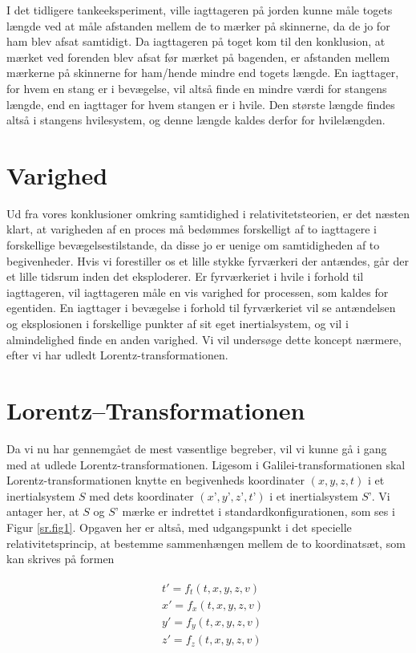 I det tidligere tankeeksperiment, ville iagttageren på jorden kunne måle togets længde ved at måle afstanden mellem de to mærker på skinnerne, da de jo for ham blev afsat samtidigt. Da iagttageren på toget kom til den konklusion, at mærket ved forenden blev afsat før mærket på bagenden, er afstanden mellem mærkerne på skinnerne for ham/hende mindre end togets længde. En iagttager, for hvem en stang er i bevægelse, vil altså finde en mindre værdi for stangens længde, end en iagttager for hvem stangen er i hvile. Den største længde findes altså i stangens hvilesystem, og denne længde kaldes derfor for hvilelængden.

\section{Varighed}

Ud fra vores konklusioner omkring samtidighed i relativitetsteorien, er det næsten klart, at varigheden af en proces må bedømmes forskelligt af to iagttagere i forskellige bevægelsestilstande, da disse jo er uenige om samtidigheden af to begivenheder. Hvis vi forestiller os et lille stykke fyrværkeri der antændes, går der et lille tidsrum inden det eksploderer. Er fyrværkeriet i hvile i forhold til iagttageren, vil iagttageren måle en vis varighed for processen, som kaldes for egentiden. En iagttager i bevægelse i forhold til fyrværkeriet vil se antændelsen og eksplosionen i forskellige punkter af sit eget inertialsystem, og vil i almindelighed finde en anden varighed. Vi vil undersøge dette koncept nærmere, efter vi har udledt Lorentz-transformationen.

\section{Lorentz--Transformationen}

Da vi nu har gennemgået de mest væsentlige begreber, vil vi kunne gå i gang med at udlede Lorentz-transformationen. Ligesom i Galilei-transformationen skal Lorentz-transformationen knytte en begivenheds koordinater $(x,y,z,t)$ i et inertialsystem $S$ med dets koordinater $(x’,y’,z’,t’)$ i et inertialsystem $S’$. Vi antager her, at $S$ og $S’$ mærke er indrettet i standardkonfigurationen, som ses i Figur \ref{sr.fig1}. Opgaven her er altså, med udgangspunkt i det specielle relativitetsprincip, at bestemme sammenhængen mellem de to koordinatsæt, som kan skrives på formen

\begin{align}
	\begin{split}
	&t'=f_t(t, x, y, z, v) \\
	&x'=f_x(t, x, y, z, v) \\
	&y'=f_y(t, x, y, z, v) \\
	&z'=f_z(t, x, y, z, v) 
	\end{split}
\end{align}

